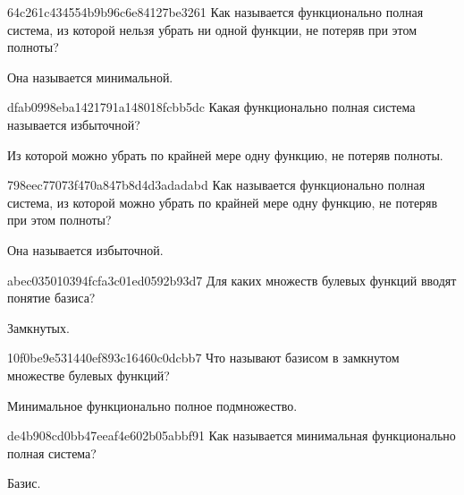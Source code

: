 \begin{note}{64c261c434554b9b96c6e84127be3261}
    Как называется функционально полная система, из которой нельзя убрать ни одной функции, не потеряв при этом полноты?

    \begin{cloze}{1}
        Она называется минимальной.
    \end{cloze}
\end{note}

\begin{note}{dfab0998eba1421791a148018fcbb5dc}
    Какая функционально полная система называется избыточной?

    \begin{cloze}{1}
        Из которой можно убрать по крайней мере одну функцию, не потеряв полноты.
    \end{cloze}
\end{note}

\begin{note}{798eec77073f470a847b8d4d3adadabd}
    Как называется функционально полная система, из которой можно убрать по крайней мере одну функцию, не потеряв при этом полноты?

    \begin{cloze}{1}
        Она называется избыточной.
    \end{cloze}
\end{note}

\begin{note}{abec035010394fcfa3c01ed0592b93d7}
    Для каких множеств булевых функций вводят понятие базиса?

    \begin{cloze}{1}
        Замкнутых.
    \end{cloze}
\end{note}

\begin{note}{10f0be9e531440ef893c16460c0dcbb7}
    Что называют базисом в замкнутом множестве булевых функций?

    \begin{cloze}{1}
        Минимальное функционально полное подмножество.
    \end{cloze}
\end{note}

\begin{note}{de4b908cd0bb47eeaf4e602b05abbf91}
    Как называется минимальная функционально полная система?

    \begin{cloze}{1}
        Базис.
    \end{cloze}
\end{note}

